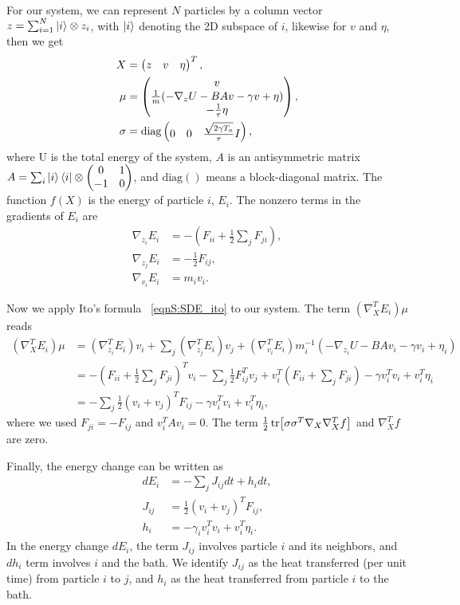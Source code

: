 \documentclass[
 amsmath,amssymb,
 aps,
 pre,
 longbibliography,
 10pt, onecolumn,
 notitlepage
]{revtex4-1}
\begin{document}
For our system, we can represent $N$ particles by a column vector $z = \sum_{i=1}^N \ket{i}\otimes z_i$, with $\ket{i}$ denoting the 2D subspace of $i$, likewise for $v$ and $\eta$, then we get
\begin{align}
X &= \pmqty{ z & v & \eta }^T, \label{eqnS:SDE_X}\\
\mu &= \pmqty{ v \\
\frac{1}{m}(-\nabla_zU - BAv - \gamma v + \eta) \\
-\frac{1}{\tau}\eta }, \label{eqnS:SDE_mu} \\
\sigma &= \text{diag} \pmqty{0 & 0 & \frac{\sqrt{2\gamma T_a}}{\tau} I}, \label{eqnS:SDE_sigma}
\end{align}
where U is the total energy of the system, $A$ is an antisymmetric matrix $A=\sum_i \ket{i}\bra{i}\otimes \mqty(0 & 1 \\ -1 & 0)$, and $\text{diag}()$ means a block-diagonal matrix.
The function $f(X)$ is the energy of particle $i$, $E_i$.
The nonzero terms in the gradients of $E_i$ are
\begin{align}
\nabla_{z_i}E_i &= -(F_{ii} + \frac{1}{2}\sum_jF_{ji}), \\
\nabla_{z_j}E_i &= -\frac{1}{2}F_{ij}, \\
\nabla_{v_i}E_i &= m_iv_i.
\end{align}

Now we apply Ito's formula \eqnname~\eqref{eqnS:SDE_ito} to our system.
The term $(\nabla_X^TE_i)\mu$ reads
\begin{equation}
\begin{split}
(\nabla_X^TE_i)\mu
&= (\nabla_{z_i}^TE_i)v_i + \sum_j(\nabla_{z_j}^TE_i)v_j + (\nabla_{v_i}^TE_i)m_i^{-1}(-\nabla_{z_i}U - BAv_i - \gamma v_i + \eta_i) \\
&= -(F_{ii} + \frac{1}{2}\sum_jF_{ji})^T v_i - \sum_j\frac{1}{2}F_{ij}^T v_j + v_i^T (F_{ii} + \sum_jF_{ji}) - \gamma v_i^Tv_i + v_i^T\eta_i \\
&= -\sum_j\frac{1}{2}(v_i + v_j)^T F_{ij} - \gamma v_i^Tv_i + v_i^T\eta_i ,
\end{split}
\end{equation}
where we used $F_{ji} = -F_{ij}$ and $v_i^TAv_i = 0$.
The term $\frac{1}{2}\tr[\sigma \sigma^T \nabla_X\nabla_X^Tf]$ and $\nabla_X^Tf$ are zero.

Finally, the energy change can be written as
\begin{align} 
dE_i &= -\sum_jJ_{ij}dt + h_i dt, \label{eqnS:flux_dEi} \\
J_{ij} &= \frac{1}{2}(v_i + v_j)^T F_{ij}, \label{eqnS:flux_Jij} \\
h_i &= -\gamma_i v_i^Tv_i +v_i^T\eta_i. \label{eqnS:flux_hi}
\end{align}
In the energy change $dE_i$, the term $J_{ij}$ involves particle $i$ and its neighbors, and $dh_i$ term involves $i$ and the bath. We identify $J_{ij}$ as the heat transferred (per unit time) from particle $i$ to $j$, and $h_i$ as the heat transferred from particle $i$ to the bath.
\end{document}
